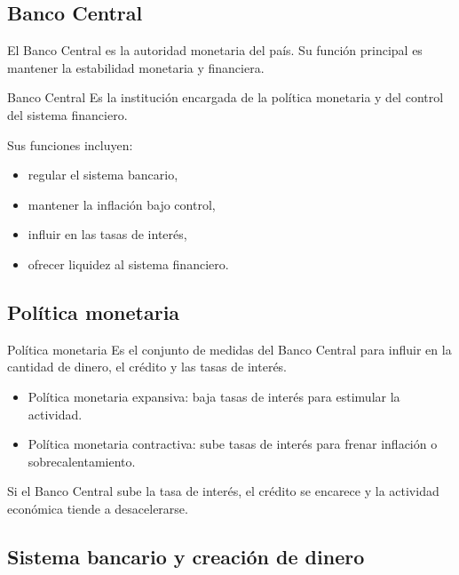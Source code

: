 \subsection{Banco Central}

El Banco Central es la autoridad monetaria del país. Su función principal es mantener la estabilidad monetaria y financiera.

\begin{concepto}{Banco Central}
Es la institución encargada de la política monetaria y del control del sistema financiero.
\end{concepto}

Sus funciones incluyen:
\begin{itemize}
    \item regular el sistema bancario,
    \item mantener la inflación bajo control,
    \item influir en las tasas de interés,
    \item ofrecer liquidez al sistema financiero.
\end{itemize}

\subsection{Política monetaria}

\begin{concepto}{Política monetaria}
Es el conjunto de medidas del Banco Central para influir en la cantidad de dinero, el crédito y las tasas de interés.
\end{concepto}

\begin{itemize}
    \item Política monetaria expansiva: baja tasas de interés para estimular la actividad.
    \item Política monetaria contractiva: sube tasas de interés para frenar inflación o sobrecalentamiento.
\end{itemize}

\begin{ejemplo}
Si el Banco Central sube la tasa de interés, el crédito se encarece y la actividad económica tiende a desacelerarse.
\end{ejemplo}

\subsection{Sistema bancario y creación de dinero}

